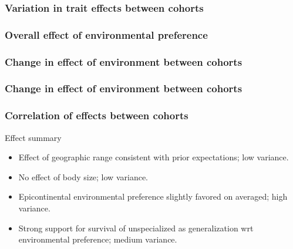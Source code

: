 \documentclass{beamer}
\begin{document}
\begin{frame}
  \frametitle{Variation in trait effects between cohorts}

  \begin{center}
  \end{center}
\end{frame}

\begin{frame}
  \frametitle{Overall effect of environmental preference}

  \begin{center}
  \end{center}
\end{frame}

\begin{frame}
  \frametitle{Change in effect of environment between cohorts}

  \begin{center}
  \end{center}
\end{frame}

\begin{frame}
  \frametitle{Change in effect of environment between cohorts}

  \begin{center}
  \end{center}
\end{frame}

\begin{frame}
  \frametitle{Correlation of effects between cohorts}

  \begin{center}
  \end{center}
\end{frame}

\begin{frame}
  \begin{block}{Effect summary}
    \begin{itemize}
      \item Effect of geographic range consistent with prior expectations; low variance.
      \item No effect of body size; low variance.
      \item Epicontinental environmental preference slightly favored on averaged; high variance. 
      \item Strong support for survival of unspecialized as generalization wrt environmental preference; medium variance.
    \end{itemize}
  \end{block}
\end{frame}
\end{document}
